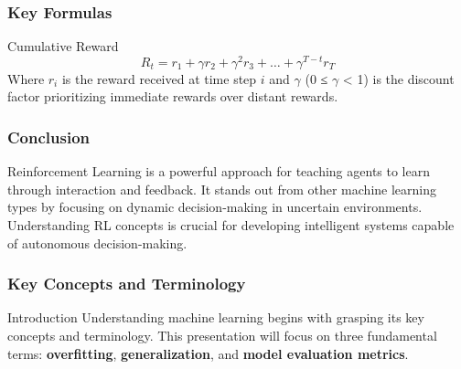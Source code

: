 \documentclass[aspectratio=169]{beamer}
\begin{document}
\begin{frame}[fragile]
    \frametitle{Key Formulas}
    \begin{block}{Cumulative Reward}
        \begin{equation}
            R_t = r_1 + \gamma r_2 + \gamma^2 r_3 + \ldots + \gamma^{T-t} r_T
        \end{equation}
        Where \( r_i \) is the reward received at time step \( i \) and \( \gamma \) (0 ≤ \( \gamma \) < 1) is the discount factor prioritizing immediate rewards over distant rewards.
    \end{block}
\end{frame}

\begin{frame}[fragile]
    \frametitle{Conclusion}
    Reinforcement Learning is a powerful approach for teaching agents to learn through interaction and feedback. It stands out from other machine learning types by focusing on dynamic decision-making in uncertain environments. Understanding RL concepts is crucial for developing intelligent systems capable of autonomous decision-making.
\end{frame}

\begin{frame}[fragile]
    \frametitle{Key Concepts and Terminology}
    \begin{block}{Introduction}
        Understanding machine learning begins with grasping its key concepts and terminology. This presentation will focus on three fundamental terms: \textbf{overfitting}, \textbf{generalization}, and \textbf{model evaluation metrics}.
    \end{block}
\end{frame}
\end{document}
